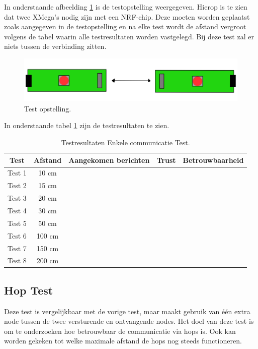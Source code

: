 In onderstaande afbeelding \ref{fig:TestCom} is de testopstelling weergegeven. Hierop is te zien dat twee XMega's nodig zijn met een NRF-chip. Deze moeten worden geplaatst zoals aangegeven in de testopstelling en na elke test wordt de afstand vergroot volgens de tabel waarin alle testresultaten worden vastgelegd. Bij deze test zal er niets tussen de verbinding zitten.
\begin{figure}[h]
    \centering
    \includegraphics[scale = 0.3]{img/Screenshot_292.png}
    \caption{Test opstelling.}
    \label{fig:TestCom}
\end{figure}
In onderstaande tabel \ref{tab:EnkelCom} zijn de testresultaten te zien.
\begin{table}[h]
    \centering
    \begin{tabular}{|c||c|c|c|c|}
        \hline
        Test    & Afstand   & Aangekomen berichten  & Trust & Betrouwbaarheid   \\\hline\hline
        Test 1  & 10 cm     &                       &       &                   \\\hline
        Test 2  & 15 cm     &                       &       &                   \\\hline
        Test 3  & 20 cm     &                       &       &                   \\\hline
        Test 4  & 30 cm     &                       &       &                   \\\hline
        Test 5  & 50 cm     &                       &       &                   \\\hline
        Test 6  & 100 cm    &                       &       &                   \\\hline
        Test 7  & 150 cm    &                       &       &                   \\\hline
        Test 8  & 200 cm    &                       &       &                   \\\hline   
    \end{tabular}
    \caption{Testresultaten Enkele communicatie Test.}
    \label{tab:EnkelCom}
\end{table}

\subsection{Hop Test}
Deze test is vergelijkbaar met de vorige test, maar maakt gebruik van één extra node tussen de twee versturende en ontvangende nodes. Het doel van deze test is om te onderzoeken hoe betrouwbaar de communicatie via hops is. Ook kan worden gekeken tot welke maximale afstand de hops nog steeds functioneren.

